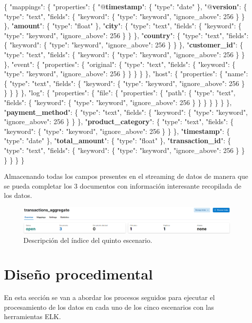 \{ "mappings": \{ "properties": \{ 
"@\textbf{timestamp}": \{ "type": "date" \}, 
"@\textbf{version}": \{ "type": "text", "fields": \{ "keyword": \{ "type": "keyword", "ignore\_above": 256 \} \} \}, 
"\textbf{amount}": \{ "type": "float" \}, 
"\textbf{city}": \{ "type": "text", "fields": \{ "keyword": \{ "type": "keyword", "ignore\_above": 256 \} \} \}, 
"\textbf{country}": \{ "type": "text", "fields": \{ "keyword": \{ "type": "keyword", "ignore\_above": 256 \} \} \}, 
"\textbf{customer\_id}": \{ "type": "text", "fields": \{ "keyword": \{ "type": "keyword", "ignore\_above": 256 \} \} \}, "event": \{ "properties": \{ "original": \{ "type": "text", "fields": \{ "keyword": \{ "type": "keyword", "ignore\_above": 256 \} \} \} \} \}, "host": \{ "properties": \{ "name": \{ "type": "text", "fields": \{ "keyword": \{ "type": "keyword", "ignore\_above": 256 \} \} \} \} \}, "log": \{ "properties": \{ "file": \{ "properties": \{ "path": \{ "type": "text", "fields": \{ "keyword": \{ "type": "keyword", "ignore\_above": 256 \} \} \} \} \} \} \}, 
"\textbf{payment\_method}": \{ "type": "text", "fields": \{ "keyword": \{ "type": "keyword", "ignore\_above": 256 \} \} \}, 
"\textbf{product\_category}": \{ "type": "text", "fields": \{ "keyword": \{ "type": "keyword", "ignore\_above": 256 \} \} \}, 
"\textbf{timestamp}": \{ "type": "date" \}, 
"\textbf{total\_amount}": \{ "type": "float" \}, 
"\textbf{transaction\_id}": \{ "type": "text", "fields": \{ "keyword": \{ "type": "keyword", "ignore\_above": 256 \} \} \} \} \} \} 

Almacenando todas los campos presentes en el streaming de datos de manera que se pueda completar los 3 documentos con información interesante recopilada de los datos.

\begin{figure}
    \centering
    \includegraphics[width=1\linewidth]{img/indice5.png}
    \caption{Descripción del índice del quinto escenario.}
    \label{fig:indice5}
\end{figure}

\section{Diseño procedimental}

En esta sección se van a abordar los procesos seguidos para ejecutar el procesamiento de los datos en cada uno de los cinco escenarios con las herramientas ELK.

